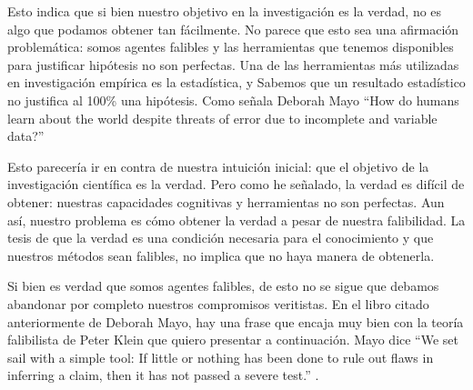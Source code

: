 \documentclass{article}
\begin{document}
Esto indica que si bien nuestro objetivo en la investigación es la verdad, no es algo que podamos obtener tan fácilmente. No parece que esto sea una afirmación problemática: somos agentes falibles y las herramientas que tenemos disponibles para justificar hipótesis no son perfectas. Una de las herramientas más utilizadas en investigación empírica es la estadística, y Sabemos que un resultado estadístico no justifica al 100\% una hipótesis. Como señala Deborah Mayo ``How do humans learn about the world despite threats of error due to incomplete and variable data?'' \cite[p.~ xi]{Mayo2018} 

Esto parecería ir en contra de nuestra intuición inicial: que el objetivo de la investigación científica es la verdad. Pero como he señalado, la verdad es difícil de obtener: nuestras capacidades cognitivas y herramientas no son perfectas. Aun así, nuestro problema es cómo obtener la verdad a pesar de nuestra falibilidad. La tesis de que la verdad es una condición necesaria para el conocimiento y que nuestros métodos sean falibles, no implica que no haya manera de obtenerla.

Si bien es verdad que somos agentes falibles, de esto no se sigue que debamos abandonar por completo nuestros compromisos veritistas. En el libro citado anteriormente de Deborah Mayo, hay una frase que encaja muy bien con la teoría falibilista de Peter Klein que quiero presentar a continuación. Mayo dice ``We set sail with a simple tool: If little or nothing has been done to rule out flaws in inferring a claim, then it has not passed a severe test.'' \cite[p.~xii]{Mayo2018}.
\end{document}
